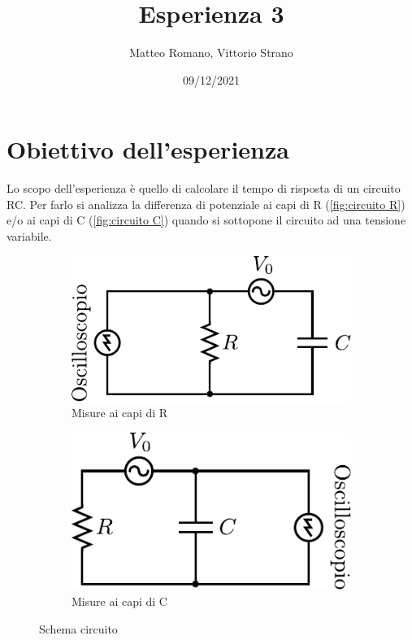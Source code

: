 \documentclass[11pt, a4paper]{article}
\title{Esperienza 3}
\author{Matteo Romano, Vittorio Strano}
\date{09/12/2021}
\numberwithin{equation}{section} %
\begin{document}
\maketitle

\tableofcontents

\section{Obiettivo dell'esperienza}

Lo scopo dell'esperienza è quello di calcolare il tempo di risposta di un circuito RC. Per farlo si analizza la differenza di potenziale ai capi di R (\autoref{fig:circuito R}) e/o ai capi di C (\autoref{fig:circuito C}) quando si sottopone il circuito ad una tensione variabile.

\begin{figure}[ht!]
    \centering
    \begin{subfigure}[c]{.3\textwidth}
        \includegraphics[width=\textwidth]{circuito_osc_R.pdf}
        \caption{Misure ai capi di R}
        \label{fig:circuito R}
    \end{subfigure}
    \hspace{1in}
    \begin{subfigure}[c]{.3\textwidth}
        \includegraphics[width=\textwidth]{circuito_osc_C.pdf}
        \caption{Misure ai capi di C}
        \label{fig:circuito C}
    \end{subfigure}
    \caption{Schema circuito}
  \end{figure}
\end{document}
